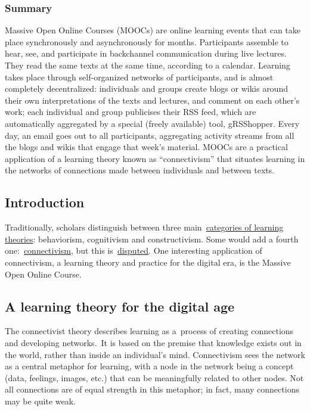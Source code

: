 \subsubsection{Summary}

Massive Open Online Courses (MOOCs) are online learning events that can
take place synchronously and asynchronously for months. Participants
assemble to hear, see, and participate in backchannel communication
during live lectures. They read the same texts at the same time,
according to a calendar. Learning takes place through self-organized
networks of participants, and is almost completely decentralized:
individuals and groups create blogs or wikis around their own
interpretations of the texts and lectures, and comment on each other's
work; each individual and group publicises their RSS feed, which are
automatically aggregated by a special (freely available) tool,
gRSShopper. Every day, an email goes out to all participants,
aggregating activity streams from all the blogs and wikis that engage
that week's material. MOOCs are a practical application of a learning
theory known as ``connectivism'' that situates learning in the networks
of connections made between individuals and between texts.

\subsection{Introduction}

Traditionally, scholars distinguish between three
main~\href{http://ryan2point0.wordpress.com/2010/01/12/taxonomy-of-learning-theories/}{categories
of learning theories}: behaviorism, cognitivism and constructivism. Some
would add a fourth
one:~\href{http://en.wikipedia.org/wiki/Connectivism}{connectivism}, but
this is~\href{http://en.wikipedia.org/wiki/Talk:Connectivism}{disputed}.
One interesting application of connectivism, a learning theory and
practice for the digital era, is the Massive Open Online Course.

\subsection{A learning theory for the digital age}

The connectivist theory describes learning as a~process of creating
connections and developing networks.~It is based on the premise that
knowledge exists out in the world, rather than inside an individual's
mind. Connectivism sees the network as a central metaphor for learning,
with a node in the network being a concept (data, feelings, images,
etc.) that can be meaningfully related to other nodes. Not all
connections are of equal strength in this metaphor; in fact, many
connections may be quite weak.

